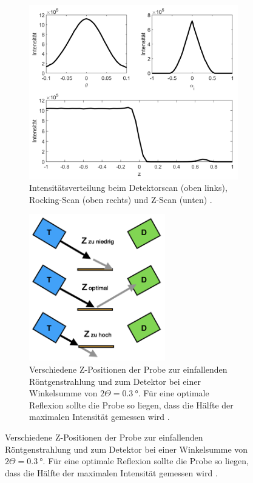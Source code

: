 \begin{figure}
    \centering
    \begin{subfigure}{0.48\textwidth}
        \centering
        \includegraphics[width=\textwidth]{content/img/Abb_5.png}
        \caption{Intensitätsverteilung beim Detektorscan (oben links),
        Rocking-Scan (oben rechts) und Z-Scan (unten) \cite{versuchsanleitung}.}
        \label{fig:scan}
    \end{subfigure}
    \hfill
    \begin{subfigure}{0.48\textwidth}
        \centering
        \includegraphics[width=0.65\textwidth]{content/img/Abb_6.png}
        \caption{Verschiedene Z-Positionen der Probe zur einfallenden Röntgenstrahlung und zum Detektor bei einer Winkelsumme von $2\Theta = \SI{0.3}{\degree}$.
        Für eine optimale Reflexion sollte die Probe so liegen,
        dass die Hälfte der maximalen Intensität gemessen wird \cite{versuchsanleitung}.}
        \label{fig:zposition03}
    \end{subfigure}
\end{figure}

